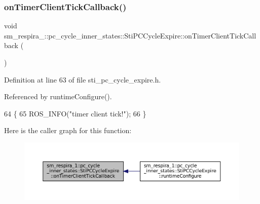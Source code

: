 \subsubsection{\texorpdfstring{on\+Timer\+Client\+Tick\+Callback()}{onTimerClientTickCallback()}}
{\footnotesize\ttfamily void sm\+\_\+respira\+\_\+::pc\+\_\+cycle\+\_\+inner\+\_\+states\+::\+Sti\+P\+C\+Cycle\+Expire\+::on\+Timer\+Client\+Tick\+Callback (\begin{DoxyParamCaption}{ }\end{DoxyParamCaption})\hspace{0.3cm}{\ttfamily [inline]}}



Definition at line 63 of file sti\+\_\+pc\+\_\+cycle\+\_\+expire.\+h.



Referenced by runtime\+Configure().


\begin{DoxyCode}
64   \{
65     ROS\_INFO(\textcolor{stringliteral}{"timer client tick!"});
66   \}
\end{DoxyCode}
Here is the caller graph for this function\+:
\nopagebreak
\begin{figure}[H]
\begin{center}
\leavevmode
\includegraphics[width=350pt]{structsm__respira__1_1_1pc__cycle__inner__states_1_1StiPCCycleExpire_a7fd642e0a6c10ef251fd3a6b8c8752ac_icgraph}
\end{center}
\end{figure}
\mbox{\label{structsm__respira__1_1_1pc__cycle__inner__states_1_1StiPCCycleExpire_a6fa2c541841c39b444f25fdd9b96f7b8}} 
